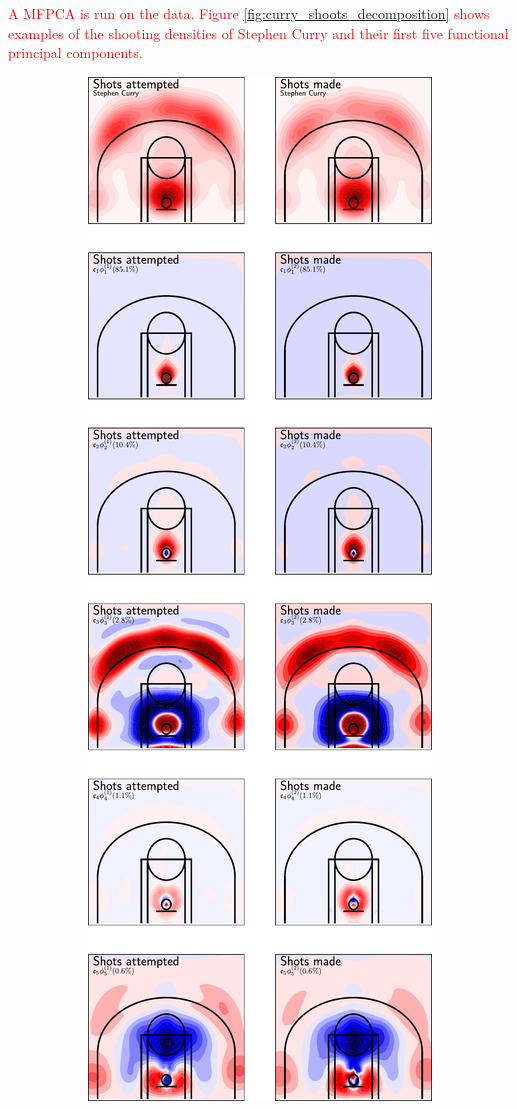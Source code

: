 \textcolor{red}{A MFPCA is run on the data. Figure \ref{fig:curry_shoots_decomposition} shows examples of the shooting densities of Stephen Curry and their first five functional principal components.}
\begin{figure}
    \centering
    \begin{subfigure}[b]{0.45\textwidth}
        \centering
        \includegraphics[width=\textwidth]{figures/curry_decomposition.pdf}

\end{subfigure}
\end{figure}
